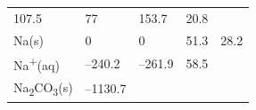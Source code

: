 \documentclass[
  9pt,
]{extbook}
\theoremstyle{definition}
\theoremstyle{definition}
\theoremstyle{definition}
\theoremstyle{remark}
\begin{document}
\begin{longtable}[]{@{}lllll@{}}
\begin{minipage}[t]{0.19\columnwidth}
107.5\strut
\end{minipage} & \begin{minipage}[t]{0.20\columnwidth}\raggedright
77\strut
\end{minipage} & \begin{minipage}[t]{0.18\columnwidth}\raggedright
153.7\strut
\end{minipage} & \begin{minipage}[t]{0.18\columnwidth}\raggedright
20.8\strut
\end{minipage}\tabularnewline
\begin{minipage}[t]{0.10\columnwidth}\raggedright
Na(s)\strut
\end{minipage} & \begin{minipage}[t]{0.19\columnwidth}\raggedright
0\strut
\end{minipage} & \begin{minipage}[t]{0.20\columnwidth}\raggedright
0\strut
\end{minipage} & \begin{minipage}[t]{0.18\columnwidth}\raggedright
51.3\strut
\end{minipage} & \begin{minipage}[t]{0.18\columnwidth}\raggedright
28.2\strut
\end{minipage}\tabularnewline
\begin{minipage}[t]{0.10\columnwidth}\raggedright
Na\textsuperscript{+}(aq)\strut
\end{minipage} & \begin{minipage}[t]{0.19\columnwidth}\raggedright
--240.2\strut
\end{minipage} & \begin{minipage}[t]{0.20\columnwidth}\raggedright
--261.9\strut
\end{minipage} & \begin{minipage}[t]{0.18\columnwidth}\raggedright
58.5\strut
\end{minipage} & \begin{minipage}[t]{0.18\columnwidth}\raggedright
\strut
\end{minipage}\tabularnewline
\begin{minipage}[t]{0.10\columnwidth}\raggedright
Na\textsubscript{2}CO\textsubscript{3}(s)\strut
\end{minipage} & \begin{minipage}[t]{0.19\columnwidth}\raggedright
--1130.7\strut
\end{minipage} & \begin{minipage}[t]{0.20\columnwidth}\raggedright

\end{minipage}
\end{longtable}
\end{document}
